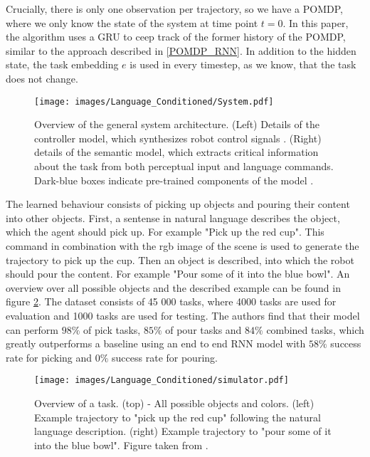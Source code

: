 Crucially, there is only one observation per trajectory, so we have a POMDP, where we only know the state of the system at time point $t=0$. In this paper, the 
algorithm uses a GRU to ceep track of the former history of the POMDP, similar to the approach described in \ref{POMDP_RNN}. In addition to the hidden state, 
the task embedding $e$ is used in every timestep, as we know, that the task does not change. \\

\begin{figure}[htbp]
    \centering
    \texttt{[image: images/Language\_Conditioned/System.pdf]}
    \caption{Overview of the general system architecture. (Left) Details of the controller model, which
    synthesizes robot control signals . (Right) details of the semantic model, which extracts critical
    information about the task from both perceptual input and language commands. Dark-blue boxes
    indicate pre-trained components of the model \cite{Language-Conditioned Imitation}.}
    \label{language_imitation}
\end{figure}

The learned behaviour consists of picking up objects and pouring their content into other objects. First, a sentense in natural language describes the object, which 
the agent should pick up. For example "Pick up the red cup". This command in combination with the rgb image of the scene is used to generate the trajectory to 
pick up the cup. Then an object is described, into which the robot should pour the content. For example "Pour some of it into the blue bowl". An overview over 
all possible objects and the described example can be found in figure \ref{lang_imi_expl}. The dataset consists of 45 000 tasks, where 4000 tasks are used for 
evaluation and 1000 tasks are used for testing. The authors find that their model can perform $98 \%$ of pick tasks, $85 \%$ of pour tasks and $84 \%$ combined 
tasks, which greatly outperforms a baseline using an end to end RNN model with $58\%$ success rate for picking and $0 \%$ success rate for pouring.

\begin{figure}[htbp]
    \centering
    \texttt{[image: images/Language\_Conditioned/simulator.pdf]}
    \caption{Overview of a task. (top) - All possible objects and colors. (left) Example trajectory to "pick up the red cup" following the natural language description. 
    (right) Example trajectory to "pour some of it into the blue bowl". Figure taken from \cite{Language-Conditioned Imitation}.}
    \label{lang_imi_expl}
\end{figure}

